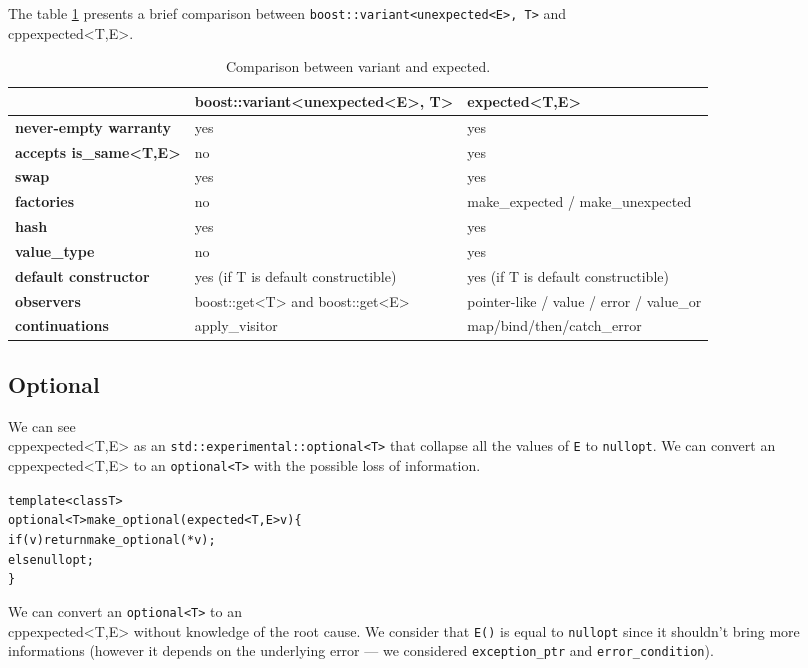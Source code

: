 \documentclass[a4paper,10pt]{article}
\newcommand{\cpp}[1]{\lstinline{#1}}
\begin{document}
The table \ref{comp-variant} presents a brief comparison between \cpp{boost::variant<unexpected<E>, T>} and \\cpp{expected<T,E>}.

\begin{table}[h!]
\bgroup
\def\arraystretch{1.5}
\begin{tabular}
{|l|>{\raggedright\arraybackslash}p{6cm}|>{\raggedright\arraybackslash}p{6cm}|}
\hline
                    & \textbf{boost::variant<unexpected<E>, T>} & \textbf{expected<T,E>}  \\
\hline
\textbf{never-empty warranty} & yes & yes \\
\hline
\textbf{accepts is_same<T,E>} & no & yes \\
\hline
\textbf{swap} & yes & yes \\
\hline
\textbf{factories} & no & make\_expected / make\_unexpected  \\
\hline
\textbf{hash} & yes & yes  \\
\hline
\textbf{value_type} & no & yes  \\
\hline
\textbf{default constructor} & yes (if T is default constructible) & yes (if T is default constructible)  \\
\hline
\textbf{observers} & boost::get<T> and boost::get<E> & pointer-like / value / error / value_or \\
\hline
\textbf{continuations} & apply_visitor & map/bind/then/catch_error  \\
\hline
\end{tabular}
\egroup
\caption{Comparison between variant and expected.}
\label{comp-variant}
\end{table}


\subsection{Optional}

We can see \\cpp{expected<T,E>} as an \cpp{std::experimental::optional<T>} that collapse all the values of \cpp{E} to \cpp{nullopt}. We can convert an \\cpp{expected<T,E>} to an \cpp{optional<T>} with the possible loss of information.

\begin{alltt}
template <class T>
optional<T> make_optional(expected<T,E> v) \{
  if (v) return make_optional(*v);
  else nullopt;
\}
\end{alltt}
\noindent
We can convert an \cpp{optional<T>} to an \\cpp{expected<T,E>} without knowledge of the root cause. We consider that \cpp{E()} is equal to \cpp{nullopt} since it shouldn't bring more informations (however it depends on the underlying error --- we considered \cpp{exception_ptr} and \cpp{error_condition}).
\end{document}

